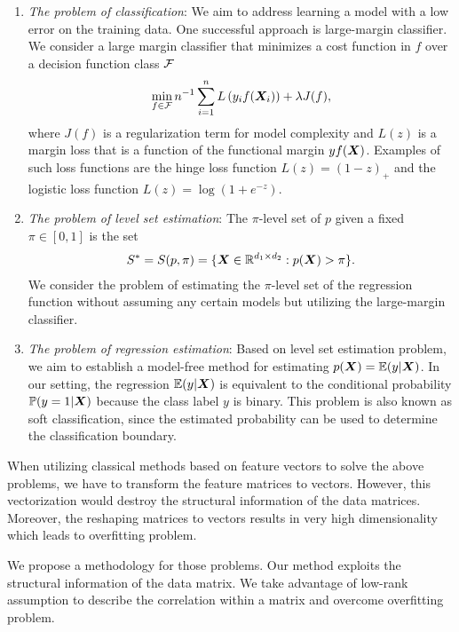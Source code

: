 \documentclass[12pt]{article}
\begin{document}
\begin{enumerate}[label={2.\arabic*}]
\item {\it The problem of classification}: We aim to address learning a model with a low error on the training data. One successful approach is large-margin classifier. We consider  a large margin classifier that minimizes a cost function in $f$ over a decision function class $\mathcal{F}$
\begin{align}
\label{eq:large-margin}
\min_{f\in\mathcal{F}}n^{-1}\sum_{i=1}^n L\left(y_i f(\bm X_i)\right)+\lambda J(f),
\end{align}
where $J(f)$ is a regularization term for model complexity and $L(z)$ is a margin loss that is a function of the functional margin $yf(\bm X)$. Examples of such loss functions are the hinge loss function $L(z) = (1-z)_+$ and the logistic loss function $L(z) =\log(1+e^{-z})$.  


\item {\it The problem of level set estimation}: The $\pi$-level set of $p$ given a fixed $\pi\in[0,1]$ is the set 
\begin{align}
S^*= S(p,\pi) = \{\bm X\in\mathbb{R}^{d_1\times d_2}: p(\bm X)>\pi\}.
\end{align}
We consider the problem of estimating the $\pi$-level set 
of the regression function without assuming any certain models but utilizing the large-margin classifier. 
\item {\it The problem of regression estimation}: Based on level set estimation problem, we aim to establish a model-free method for  estimating $p(\bm X) = \mathbb{E}(y|\bm X)$.  In our setting, the regression $ \mathbb{E}(y|\bm X)$  is equivalent to  the conditional probability $\mathbb{P}(y = 1|\bm X)$ because the class label $y$ is binary.  This problem is also known as soft classification, since the estimated probability can be used to determine the classification boundary.
\end{enumerate}

When utilizing classical methods based on feature vectors to solve the above problems, we have to transform the feature matrices to vectors. However, this vectorization would destroy the structural information of the data matrices. Moreover, the reshaping matrices to vectors results in very high dimensionality which leads to overfitting problem.

We propose a methodology for those problems. Our method exploits the structural information of the data matrix. We take advantage of low-rank assumption to describe the correlation within a matrix and overcome overfitting problem.
 
\end{document}
